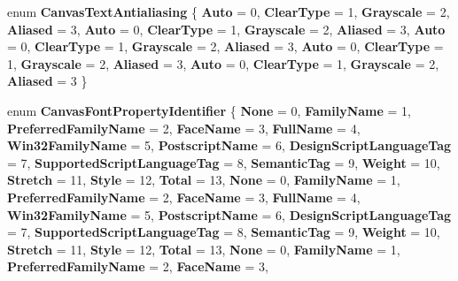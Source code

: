\begin{DoxyCompactItemize}
enum {\bfseries Canvas\+Text\+Antialiasing} \{ \newline
{\bfseries Auto} = 0, 
{\bfseries Clear\+Type} = 1, 
{\bfseries Grayscale} = 2, 
{\bfseries Aliased} = 3, 
\newline
{\bfseries Auto} = 0, 
{\bfseries Clear\+Type} = 1, 
{\bfseries Grayscale} = 2, 
{\bfseries Aliased} = 3, 
\newline
{\bfseries Auto} = 0, 
{\bfseries Clear\+Type} = 1, 
{\bfseries Grayscale} = 2, 
{\bfseries Aliased} = 3, 
\newline
{\bfseries Auto} = 0, 
{\bfseries Clear\+Type} = 1, 
{\bfseries Grayscale} = 2, 
{\bfseries Aliased} = 3, 
\newline
{\bfseries Auto} = 0, 
{\bfseries Clear\+Type} = 1, 
{\bfseries Grayscale} = 2, 
{\bfseries Aliased} = 3
 \}
\item 
\mbox{\label{namespace_microsoft_1_1_graphics_1_1_canvas_1_1_text_a79bca70c038ce3691b2e0c4ded541979}} 
enum {\bfseries Canvas\+Font\+Property\+Identifier} \{ \newline
{\bfseries None} = 0, 
{\bfseries Family\+Name} = 1, 
{\bfseries Preferred\+Family\+Name} = 2, 
{\bfseries Face\+Name} = 3, 
\newline
{\bfseries Full\+Name} = 4, 
{\bfseries Win32\+Family\+Name} = 5, 
{\bfseries Postscript\+Name} = 6, 
{\bfseries Design\+Script\+Language\+Tag} = 7, 
\newline
{\bfseries Supported\+Script\+Language\+Tag} = 8, 
{\bfseries Semantic\+Tag} = 9, 
{\bfseries Weight} = 10, 
{\bfseries Stretch} = 11, 
\newline
{\bfseries Style} = 12, 
{\bfseries Total} = 13, 
{\bfseries None} = 0, 
{\bfseries Family\+Name} = 1, 
\newline
{\bfseries Preferred\+Family\+Name} = 2, 
{\bfseries Face\+Name} = 3, 
{\bfseries Full\+Name} = 4, 
{\bfseries Win32\+Family\+Name} = 5, 
\newline
{\bfseries Postscript\+Name} = 6, 
{\bfseries Design\+Script\+Language\+Tag} = 7, 
{\bfseries Supported\+Script\+Language\+Tag} = 8, 
{\bfseries Semantic\+Tag} = 9, 
\newline
{\bfseries Weight} = 10, 
{\bfseries Stretch} = 11, 
{\bfseries Style} = 12, 
{\bfseries Total} = 13, 
\newline
{\bfseries None} = 0, 
{\bfseries Family\+Name} = 1, 
{\bfseries Preferred\+Family\+Name} = 2, 
{\bfseries Face\+Name} = 3, 
\newline

\end{DoxyCompactItemize}
